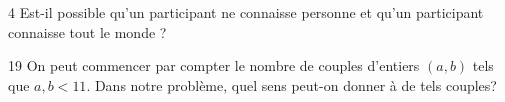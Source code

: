 \begin{Hint2}{4}
Est-il possible qu'un participant ne connaisse personne et qu'un participant connaisse tout le monde ?
\end{Hint2}
\begin{Hint2}{19}
On peut commencer par compter le nombre de couples d'entiers $\left(a,b\right)$ tels que $a,b<11$. Dans notre probl\`eme, quel sens peut-on donner \`a de tels couples?
\end{Hint2}
